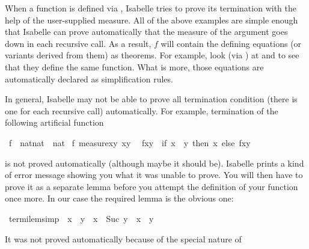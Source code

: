 %
\begin{isabellebody}%
%
\begin{isamarkuptext}%
When a function is defined via , Isabelle tries to prove
its termination with the help of the user-supplied measure.  All of the above
examples are simple enough that Isabelle can prove automatically that the
measure of the argument goes down in each recursive call. As a result,
$f$ will contain the defining equations (or variants derived
from them) as theorems. For example, look (via ) at
 and  to see that they define
the same function. What is more, those equations are automatically declared as
simplification rules.

In general, Isabelle may not be able to prove all termination condition
(there is one for each recursive call) automatically. For example,
termination of the following artificial function%
\end{isamarkuptext}%
\ f\ {\isacharcolon}{\isacharcolon}\ {\isachardoublequote}nat{\isacharasterisk}nat\ {\isasymRightarrow}\ nat{\isachardoublequote}\isanewline
{}\ f\ {\isachardoublequote}measure{\isacharparenleft}{\isasymlambda}{\isacharparenleft}x{\isacharcomma}y{\isacharparenright}{\isachardot}\ x{\isacharminus}y{\isacharparenright}{\isachardoublequote}\isanewline
\ \ {\isachardoublequote}f{\isacharparenleft}x{\isacharcomma}y{\isacharparenright}\ {\isacharequal}\ {\isacharparenleft}if\ x\ {\isasymle}\ y\ then\ x\ else\ f{\isacharparenleft}x{\isacharcomma}y{\isacharplus}%
\begin{isamarkuptext}%
\noindent
is not proved automatically (although maybe it should be). Isabelle prints a
kind of error message showing you what it was unable to prove. You will then
have to prove it as a separate lemma before you attempt the definition
of your function once more. In our case the required lemma is the obvious one:%
\end{isamarkuptext}%
\ termi{\isacharunderscore}lem{\isacharbrackleft}simp{\isacharbrackright}{\isacharcolon}\ {\isachardoublequote}{\isasymnot}\ x\ {\isasymle}\ y\ {\isasymLongrightarrow}\ x\ {\isacharminus}\ Suc\ y\ {\isacharless}\ x\ {\isacharminus}\ y{\isachardoublequote}%
\begin{isamarkuptxt}%
\noindent
It was not proved automatically because of the special nature of \isa{{\isacharminus}}

\end{isamarkuptxt}
\end{isabellebody}
